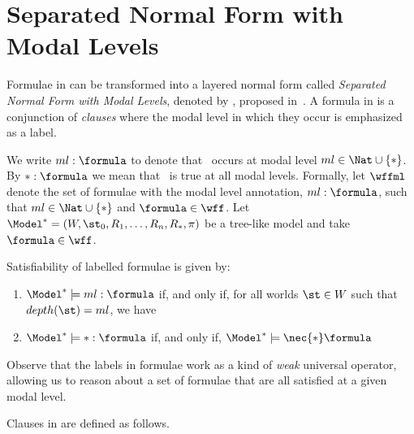 

\section{Separated Normal Form with Modal Levels}

Formulae in  can be transformed into a layered normal form called
\emph{Separated Normal Form with Modal Levels}, denoted by
, proposed in~\cite{journals/jal/NalonD07}. A formula in  is a
conjunction of \emph{clauses} where the modal level in which they occur is
emphasized as a label.

We write $ml: \formula$ to denote that \formula~occurs at modal level $ml\in
\Nat \cup \{*\}$. By $*: \formula$ we mean that \formula~is true at
all modal levels. Formally, let $\wffml$ denote the set of formulae with
the modal level annotation, $ml : \formula$, such that $ml \in \Nat \cup \{*\}$
and $\formula \in \wff$. Let $\Model^* = (W, \st_0, R_1, \ldots, R_n, R_*, \pi)$
be a tree-like model and take $\formula \in \wff$. 

\begin{definition}
Satisfiability of labelled formulae is given by:

\begin{enumerate}
    \item $\Model^* \models ml : \formula$ if, and only if, for all worlds
        $\st \in W$ such that $depth(\st) = ml$, we have
        \sat{\Model^*}{\st}{\formula} 
    \item $\Model^* \models * : \formula$ if, and only if, $\Model^* \models
        \nec{*} \formula$
\end{enumerate}
    
\end{definition}

Observe that the labels in formulae work as a kind of \textit{weak} universal
operator, allowing us to reason about a set of formulae that are all satisfied
at a given modal level.

Clauses in  are defined as follows.

